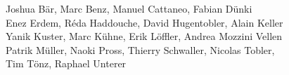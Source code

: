 %
%
%
Joshua Bär,			%
Marc Benz,			%
Manuel Cattaneo,		%
Fabian Dünki%
\\
Enez Erdem,			%
Réda Haddouche,			%
David Hugentobler,		%
Alain Keller%
\\
Yanik Kuster,			%
Marc Kühne,			%
Erik Löffler,			%
Andrea Mozzini Vellen%
\\
Patrik Müller,			%
Naoki Pross,			%
Thierry Schwaller,		%
Nicolas Tobler,			%
\\
Tim Tönz,			%
Raphael Unterer

